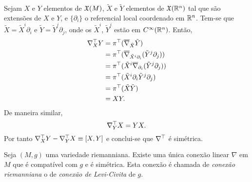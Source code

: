 \begin{demonstracao}
	Sejam $X$ e $Y$ elementos de $\mathfrak{X}(M)$, $\tilde{X}$ e $\tilde{Y}$ elementos de $\mathfrak{X}(\mathbb{R}^n)$ tal que são extensões de $X$ e $Y$, e $\{ \partial_i \}$ o referencial local coordenado em $\mathbb{R}^n$. Tem-se que $\tilde{X} = \tilde{X}^i \partial_i$ e $\tilde{Y} = \tilde{Y}^j \partial_j$, onde os $\tilde{X}^i$, $\tilde{Y}^j$ estão em $C^\infty(\mathbb{R}^n)$. Então,
	\begin{align*}
		\nabla^\top_X Y &= \pi^\top (\overline{\nabla}_{\tilde{X}} \tilde{Y})\\
		&= \pi^\top (\overline{\nabla}_{\tilde{X}^i \partial_i} (\tilde{Y}^j \partial_j))\\
		&= \pi^\top (\tilde{X}^i \overline{\nabla}_{\partial_i} (\tilde{Y}^j \partial_j))\\
		&= \pi^\top (\tilde{X}^i \partial_i \tilde{Y}^j \partial_j)\\
		&= \pi^\top (\tilde{X} \tilde{Y})\\
		&= XY.
	\end{align*}
	De maneira similar,
	\begin{equation*}
		\nabla^\top_Y X = YX.
	\end{equation*}
	Por tanto $ \nabla^\top_X Y - \nabla^\top_Y X \equiv [X,Y] $ e conclui-se que $\nabla^\top$ é simétrica.
\end{demonstracao}




\begin{teorema}\label{conexao-riemanniana}
	Seja $(M,g)$ uma variedade riemanniana. Existe uma única conexão linear $\nabla$ em $M$ que é compatível com $g$ e é simétrica.
	Esta conexão é chamada de \emph{conexão riemanniana} o de \emph{conexão de Levi-Civita} de $g$.
\end{teorema}

